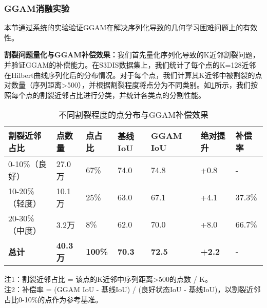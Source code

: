 \documentclass[preprint,12pt]{elsarticle}
\begin{document}


\subsubsection{GGAM消融实验}

本节通过系统的实验验证GGAM在解决序列化导致的几何学习困难问题上的有效性。


\textbf{割裂问题量化与GGAM补偿效果：}我们首先量化序列化导致的K近邻割裂问题，并验证GGAM的补偿能力。在S3DIS数据集上，我们统计了每个点的K=128近邻在Hilbert曲线序列化后的分布情况。对于每个点，我们计算其K近邻中被割裂的点对数量（序列距离>500），并根据割裂程度将点分为不同类别。如\cref{tab:split_and_repair}所示，我们按照每个点的割裂近邻占比进行分类，并统计各类点的分割性能。

\begin{table}[htbp!]
	\centering
	\caption{不同割裂程度的点分布与GGAM补偿效果}
	\label{tab:split_and_repair}
	\begin{tabular}{@{}lllllll@{}}
		\toprule
		割裂近邻占比 & 点数量 & 点占比 & 基线IoU & GGAM IoU & 绝对提升 & 补偿率 \\
		\midrule
		0-10\%（良好） & 27.0万 & 67\% & 74.0 & 74.8 & +0.8 & - \\
		\midrule
		10-20\%（轻度） & 10.1万 & 25\% & 63.0 & 67.1 & +4.1 & 37.3\% \\
		20-30\%（中度） & 3.2万 & 8\% & 62.0 & 70.0 & +8.0 & 66.7\% \\
		\midrule
		\textbf{总计} & \textbf{40.3万} & \textbf{100\%} & \textbf{70.3} & \textbf{72.5} & \textbf{+2.2} & \textbf{-} \\
		\bottomrule
	\end{tabular}
\end{table}

注1：割裂近邻占比 = 该点的K近邻中序列距离>500的点数 / K。\\
注2：补偿率 = (GGAM IoU - 基线IoU) / (良好状态IoU - 基线IoU)，以割裂近邻占比0-10\%的点作为参考基准。
\end{document}
